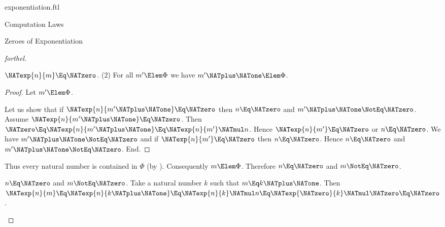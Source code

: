 \documentclass{stex}
\begin{document}
\begin{smodule}{exponentiation.ftl}
\begin{sfragment}{Computation Laws}
\begin{sfragment}{Zeroes of Exponentiation}
\begin{proof}[forthel]
\begin{case}{$\NATexp{n}{m} \Eq \NATzero$.}
        (2) For all $m' \Elem \Phi$ we have $m' \NATplus \NATone \Elem \Phi$.
        \begin{proof}
          Let $m' \Elem \Phi$.

          Let us show that if $\NATexp{n}{m' \NATplus \NATone} \Eq \NATzero$ then $n \Eq \NATzero$ and $m' \NATplus \NATone \NotEq \NATzero$.
            Assume $\NATexp{n}{m' \NATplus \NATone} \Eq \NATzero$.
            Then $\NATzero \Eq \NATexp{n}{m' \NATplus \NATone} \Eq \NATexp{n}{m'} \NATmul n$.
            Hence $\NATexp{n}{m'} \Eq \NATzero$ or $n \Eq \NATzero$.
            We have $m' \NATplus \NATone \NotEq \NATzero$ and if $\NATexp{n}{m'} \Eq \NATzero$ then $n \Eq \NATzero$.
            Hence $n \Eq \NATzero$ and $m' \NATplus \NATone \NotEq \NATzero$.
          End.
        \end{proof}

        Thus every natural number is contained in $\Phi$ (by ).
        Consequently $m \Elem \Phi$.
        Therefore $n \Eq \NATzero$ and $m \NotEq \NATzero$.
      \end{case}

      \begin{case}{$n \Eq \NATzero$ and $m \NotEq \NATzero$.}
        Take a natural number $k$ such that $m \Eq k \NATplus \NATone$.
        Then $\NATexp{n}{m}
          \Eq \NATexp{n}{k \NATplus \NATone}
          \Eq \NATexp{n}{k} \NATmul n
          \Eq \NATexp{\NATzero}{k} \NATmul \NATzero
          \Eq \NATzero$.
      \end{case}
    \end{proof}
  \end{sfragment}
\end{sfragment}
\end{smodule}
\end{document}
